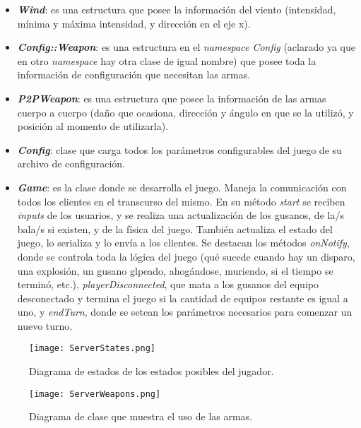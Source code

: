 \begin{itemize}
	\item \textbf{\textit{Wind}}: es una estructura que posee la información del viento (intensidad, mínima y máxima intensidad, y dirección en el eje x).
	
	\item \textbf{\textit{Config::Weapon}}: es una estructura en el \textit{namespace Config} (aclarado ya que en otro \textit{namespace} hay otra clase de igual nombre) que posee toda la información de configuración que necesitan las armas.
	
	\item \textbf{\textit{P2PWeapon}}: es una estructura que posee la información de las armas cuerpo a cuerpo (daño que ocasiona, dirección y ángulo en que se la utilizó, y posición al momento de utilizarla).
	
	\item \textbf{\textit{Config}}: clase que carga todos los parámetros configurables del juego de su archivo de configuración.
	
	\item \textbf{\textit{Game}}: es la clase donde se desarrolla el juego. Maneja la comunicación con todos los clientes en el transcurso del mismo. En su método \textit{start} se reciben \textit{inputs} de los usuarios, y se realiza una actualización de los gusanos, de la/s bala/s si existen, y de la física del juego. También actualiza el estado del juego, lo serializa y lo envía a los clientes. Se destacan los métodos \textit{onNotify}, donde se controla toda la lógica del juego (qué sucede cuando hay un disparo, una explosión, un gusano glpeado, ahogándose, muriendo, si el tiempo se terminó, etc.), \textit{playerDisconnected}, que mata a los gusanos del equipo desconectado y termina el juego si la cantidad de equipos restante es igual a uno, y \textit{endTurn}, donde se setean los parámetros necesarios para comenzar un nuevo turno.
\end{itemize}

\begin{sidewaysfigure}[!ht]
	\centering
	\texttt{[image: ServerStates.png]}
	\caption{Diagrama de estados de los estados posibles del jugador.}
	\label{im:serverState}
\end{sidewaysfigure}

\begin{sidewaysfigure}[!ht]
	\centering
	\texttt{[image: ServerWeapons.png]}
	\caption{Diagrama de clase que muestra el uso de las armas.}
	\label{im:serverWeapons}
\end{sidewaysfigure}